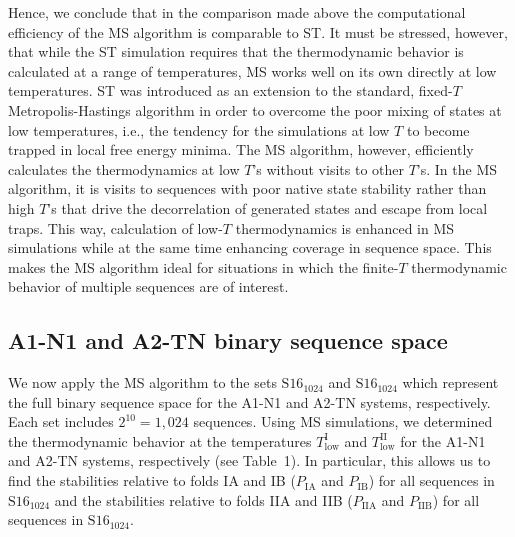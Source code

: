 \documentclass[%
 aip,
rsi,%
 amsmath,amssymb,
 reprint,%
]{revtex4-1}
\newcommand {\TlowI}     {{T^\mathrm{I}_\mathrm{low}}}
\newcommand {\TlowII}    {{T^\mathrm{II}_\mathrm{low}}}
\newcommand {\PIA}    	{{P_\mathrm{IA}}}
\newcommand {\PIB}    	{{P_\mathrm{IB}}}
\newcommand {\PIIA}    	{{P_\mathrm{IIA}}}
\newcommand {\PIIB}    	{{P_\mathrm{IIB}}}
\newcommand {\SI}		{${\mathrm{S16}_{1024}}$}
\newcommand {\SII}		{${\mathrm{S16}_{1024}}$}
\begin{document}
Hence, we conclude that in the comparison made above the computational efficiency of the MS algorithm is comparable to ST. It must be stressed, however, that while the ST simulation requires that the thermodynamic behavior is calculated at a range of temperatures, MS works well on its own directly at low temperatures. ST was introduced as an extension to the standard, fixed-$T$ Metropolis-Hastings algorithm in order to overcome the poor mixing of states at low temperatures, i.e., the tendency for the simulations at low $T$ to become trapped in local free energy minima. The MS algorithm, however, efficiently calculates the thermodynamics at low $T$'s without visits to other $T$'s. In the MS algorithm, it is visits to sequences with poor native state stability rather than high $T$'s that drive the decorrelation of generated states and escape from local traps. This way, calculation of low-$T$ thermodynamics is enhanced in MS simulations while at the same time enhancing coverage in sequence space. This makes the MS algorithm ideal for situations in which the finite-$T$ thermodynamic behavior of multiple sequences are of interest. 

\vspace{12pt}
\subsection{A1-N1 and A2-TN binary sequence space}
\noindent

We now apply the MS algorithm to the sets {\SI} and {\SII} which represent the full binary sequence space for the A1-N1 and A2-TN systems, respectively. Each set includes $2^{10}=1,024$ sequences. Using MS simulations, we determined the thermodynamic behavior at the temperatures $\TlowI$ and $\TlowII$ for the A1-N1 and A2-TN systems, respectively (see Table~1). In particular, this allows us to find the stabilities relative to folds IA and IB ($\PIA$ and $\PIB$) for all sequences in {\SI} and the stabilities relative to folds IIA and IIB ($\PIIA$ and $\PIIB$) for all sequences in {\SII}.
\end{document}
